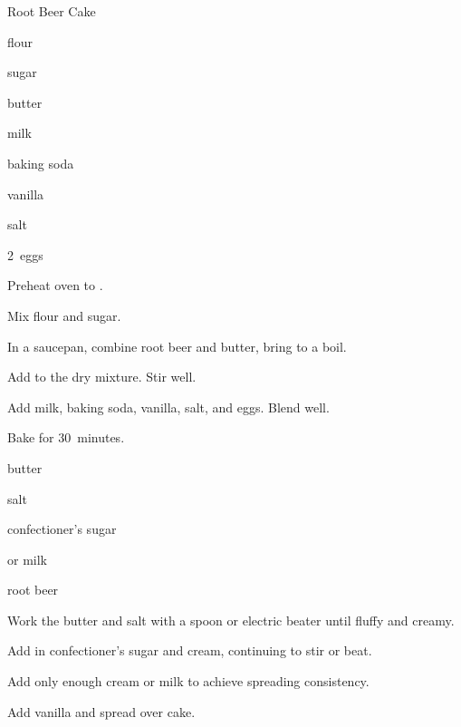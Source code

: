 \begin{recipe}{Root Beer Cake}{}{}

\begin{ingredients}
\item {} flour
\item {} sugar
\item {} 
\item {} butter
\item \C{\half} milk
\item {} baking soda
\item {} vanilla
\item \tp{\half} salt
\item 2~eggs
\end{ingredients}

\begin{directions}
\item Preheat oven to .
\item Mix flour and sugar.
\item In a saucepan, combine root beer and butter, bring to a boil.
\item Add to the dry mixture.  Stir well.
\item Add milk, baking soda, vanilla, salt, and eggs. Blend well.
\item Bake for 30~minutes. 
\end{directions}


\begin{ingredients}
\item \C{\quarter} butter
\item \tp{\eighth} salt
\item {} confectioner's sugar
\item {}  or milk
\item {} root beer
\end{ingredients}

\begin{directions}
\item Work the butter and salt with a spoon or electric beater until fluffy and creamy.
\item Add in confectioner's sugar and cream, continuing to stir or beat.
\item Add only enough cream or milk to achieve spreading consistency.
\item Add vanilla and spread over cake.
\end{directions}
\end{recipe}
